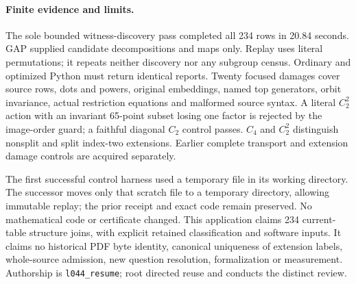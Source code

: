 \documentclass[11pt]{article}
\begin{document}
\paragraph{Finite evidence and limits.}
The sole bounded witness-discovery pass completed all 234 rows in 20.84
seconds. GAP supplied candidate decompositions and maps only. Replay uses
literal permutations; it repeats neither discovery nor any subgroup census.
Ordinary and optimized Python must return identical reports. Twenty focused
damages cover source rows, dots and powers, original embeddings, named top
generators, orbit invariance, actual restriction equations and malformed
source syntax. A literal $C_2^2$ action with an invariant 65-point subset
losing one factor is rejected by the image-order guard; a faithful diagonal
$C_2$ control passes. $C_4$ and $C_2^2$ distinguish nonsplit and split
index-two extensions. Earlier complete transport and extension damage
controls are acquired separately.

The first successful control harness used a temporary file in its working
directory. The successor moves only that scratch file to a temporary
directory, allowing immutable replay; the prior receipt and exact code
remain preserved. No mathematical code or certificate changed. This
application claims 234 current-table structure joins, with explicit retained
classification and software inputs. It claims no historical PDF byte identity,
canonical uniqueness of extension labels, whole-source admission, new
question resolution, formalization or measurement. Authorship is
\texttt{l044\_resume}; root directed reuse and conducts the distinct review.
\end{document}
